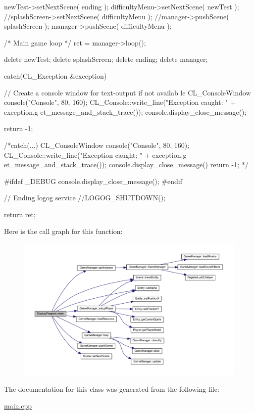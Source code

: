 \begin{DoxyCode}
{{                        newTest->setNextScene( ending );
                        difficultyMenu->setNextScene( newTest );
                        //splashScreen->setNextScene( difficultyMenu );
                        //manager->pushScene( splashScreen );
                        manager->pushScene( difficultyMenu );
        
                        /* Main game loop */
                        ret = manager->loop();
        
                        delete newTest;
                        delete splashScreen;
                        delete ending;
                        delete manager;

                }
                catch(CL_Exception &exception)
                {
                        // Create a console window for text-output if not availab
      le
                        CL_ConsoleWindow console("Console", 80, 160);
                        CL_Console::write_line("Exception caught: " + exception.g
      et_message_and_stack_trace());
                        console.display_close_message();

                        return -1;
                }
                /*catch(...)
                {
                        CL_ConsoleWindow console("Console", 80, 160);
                        CL_Console::write_line("Exception caught: " + exception.g
      et_message_and_stack_trace());
                        console.display_close_message()
                        return -1;
                }*/


#ifdef _DEBUG
                console.display_close_message();
#endif

                // Ending logog service
                //LOGOG_SHUTDOWN();

                return ret;
        }
\end{DoxyCode}


Here is the call graph for this function:
\nopagebreak
\begin{figure}[H]
\begin{center}
\leavevmode
\includegraphics[width=400pt]{d9/d69/class_display_program_a4794ecc3b07210628a3eba8415993e1d_cgraph}
\end{center}
\end{figure}




The documentation for this class was generated from the following file:\begin{DoxyCompactItemize}
\item 
\hyperlink{main_8cpp}{main.cpp}\end{DoxyCompactItemize}
